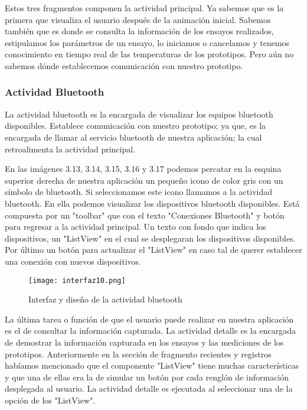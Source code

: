 \par \noindent
Estos tres fragmentos componen la actividad principal. Ya sabemos que es la primera que visualiza el usuario después de la animación inicial. Sabemos también que es donde se consulta la información de los ensayos realizados, estipulamos los parámetros de un ensayo, lo iniciamos o cancelamos y tenemos conocimiento en tiempo real de las temperaturas de los prototipos. Pero aún no sabemos dónde establecemos comunicación con nuestro prototipo. 

\subsubsection{Actividad Bluetooth}

\par 
La actividad bluetooth es la encargada de visualizar los equipos bluetooth disponibles. Establece comunicación con nuestro prototipo; ya que, es la encargada de llamar al servicio bluetooth de nuestra aplicación; la cual retroalimenta la actividad principal.

\par \noindent
En las imágenes 3.13, 3.14, 3.15, 3.16 y 3.17 podemos percatar en la esquina superior derecha de nuestra aplicación un pequeño icono de color gris con un símbolo de bluetooth. Si seleccionamos este icono llamamos a la actividad bluetooth. En ella podemos visualizar los dispositivos bluetooth disponibles. Está compuesta por un "toolbar" que con el texto "Conexiones Bluetooth" y botón para regresar a la actividad principal. Un texto con fondo que indica los dispositivos, un "ListView" en el cual se desplegaran los dispositivos disponibles. Por último un botón para actualizar el "ListView" en caso tal de querer establecer una conexión con nuevos dispositivos.

\begin{figure}[H]
	\centering
	\texttt{[image: interfaz10.png]}
	\caption{Interfaz y diseño de la actividad bluetooth}
\end{figure}

\par \noindent
La última tarea o función de que el usuario puede realizar en nuestra aplicación es el de consultar la información capturada. La actividad detalle es la encargada de demostrar la información capturada en los ensayos y las mediciones de los prototipos. Anteriormente en la sección de fragmento recientes y registros habíamos mencionado que el componente "ListView" tiene muchas características y que una de ellas era la de simular un botón por cada renglón de información desplegada al usuario. La actividad detalle es ejecutada al seleccionar una de la opción de los "ListView".

